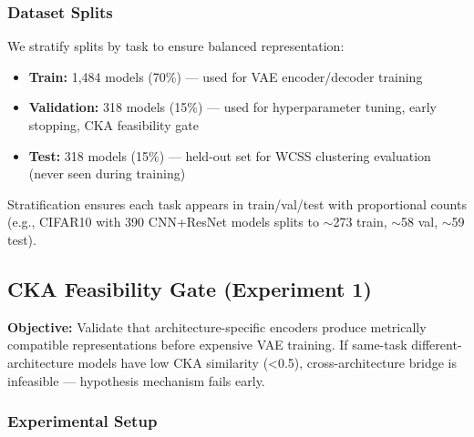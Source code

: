 \subsubsection{Dataset Splits}

We stratify splits by task to ensure balanced representation:

\begin{itemize}
\item \textbf{Train:} 1,484 models (70\%) --- used for VAE encoder/decoder training
\item \textbf{Validation:} 318 models (15\%) --- used for hyperparameter tuning, early stopping, CKA feasibility gate
\item \textbf{Test:} 318 models (15\%) --- held-out set for WCSS clustering evaluation (never seen during training)
\end{itemize}

Stratification ensures each task appears in train/val/test with proportional counts (e.g., CIFAR10 with 390 CNN+ResNet models splits to $\sim$273 train, $\sim$58 val, $\sim$59 test).

\subsection{CKA Feasibility Gate (Experiment 1)}

\textbf{Objective:} Validate that architecture-specific encoders produce metrically compatible representations before expensive VAE training. If same-task different-architecture models have low CKA similarity (<0.5), cross-architecture bridge is infeasible --- hypothesis mechanism fails early.

\subsubsection{Experimental Setup}

